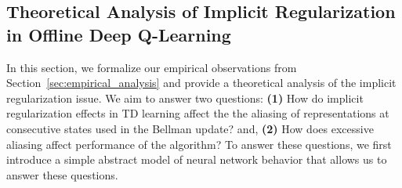 \subsection{Theoretical Analysis of Implicit Regularization in Offline Deep Q-Learning}
\label{sec:theory_evidence}
In this section, we formalize our empirical observations from Section~\ref{sec:empirical_analysis} and provide a theoretical analysis of the implicit regularization issue. We aim to answer two questions: \textbf{(1)} How do implicit regularization effects in TD learning affect the the aliasing of representations at consecutive states used in the Bellman update? and, \textbf{(2)} How does excessive aliasing affect performance of the algorithm? To answer these questions, we first introduce a simple abstract model of neural network behavior
that allows us to answer these questions.

